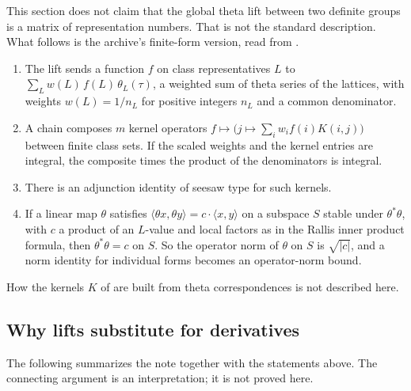 \documentclass[11pt]{amsbook}
\theoremstyle{plain}
\theoremstyle{definition}
\theoremstyle{remark}
\numberwithin{equation}{section}
\numberwithin{figure}{chapter}
\numberwithin{table}{chapter}
\begin{document}
This section does not claim that the global theta lift between two
definite groups is a matrix of representation numbers. That is not
the standard description. What follows is the archive's finite-form
version, read from
\cite[\nolinkurl{Formalism/ThetaLiftIndependence/Statement.lean}]
{AlpogeArchive2026}.
\begin{enumerate}[label=(\roman*)]
\item The lift sends a function $f$ on class representatives $L$ to
$\sum_L w(L)\,f(L)\,\theta_L(\tau)$, a weighted sum of theta series
of the lattices, with weights $w(L) = 1/n_L$ for positive integers
$n_L$ and a common denominator.
\item A chain composes $m$ kernel operators
$f \mapsto \bigl(j \mapsto \sum_i w_i f(i) K(i,j)\bigr)$ between
finite class sets. If the scaled weights and the kernel entries are
integral, the composite times the product of the denominators is
integral.
\item There is an adjunction identity of seesaw type for such
kernels.
\item If a linear map $\theta$ satisfies
$\langle\theta x, \theta y\rangle = c\cdot\langle x, y\rangle$ on a
subspace $S$ stable under $\theta^*\theta$, with $c$ a product of an
$L$-value and local factors as in the Rallis inner product formula,
then $\theta^*\theta = c$ on $S$. So the operator norm of $\theta$
on $S$ is $\sqrt{|c|}$, and a norm identity for individual forms
becomes an operator-norm bound.
\end{enumerate}
How the kernels $K$ of \cite{AlpogeArchive2026} are built from theta
correspondences is not described here.

\subsection{Why lifts substitute for derivatives}
\label{subsec:lifts-derivatives}

The following summarizes the note
\cite[pp.~3--4, steps 8--12]{AlpogeRemark2026} together with the
statements above. The connecting argument is an interpretation; it
is not proved here.
\end{document}
